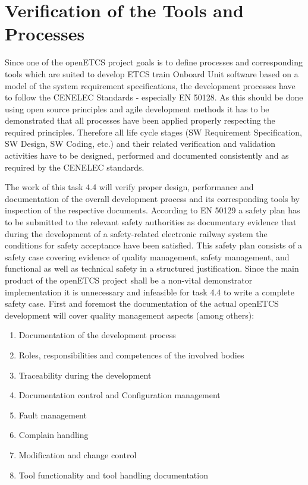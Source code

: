 \section{Verification of the Tools and Processes}
Since one of the openETCS project goals is to define processes and corresponding tools which are suited to develop ETCS train Onboard Unit software based on a model of the system requirement specifications, the development processes have to follow the CENELEC Standards - especially EN 50128. As this should be done using open source principles and agile development methods it has to be demonstrated that all processes have been applied properly respecting the required principles. Therefore all life cycle stages (SW Requirement Specification, SW Design, SW Coding, etc.) and their related verification and validation activities have to be designed, performed and documented consistently and as required by the CENELEC standards. 

The work of this task 4.4 will verify proper design, performance and documentation of the overall development process and its corresponding tools by inspection of the respective documents. According to EN 50129 a safety plan has to be submitted to the relevant safety authorities as documentary evidence that during the development of a safety-related electronic railway system the conditions for safety acceptance have been satisfied. This safety plan consists of a safety case covering evidence of quality management, safety management, and functional as well as technical safety in a structured justification. Since  the main product of the openETCS project shall be a non-vital demonstrator implementation it is unnecessary and infeasible for task 4.4 to write a complete safety case. First and foremost the documentation of the actual openETCS development will cover quality management aspects (among others):
\begin{enumerate}
\item  Documentation of the development process
\item  Roles, responsibilities and competences of the involved bodies
\item  Traceability during the development
\item  Documentation control and Configuration management
\item  Fault management
\item  Complain handling
\item  Modification and change control
\item  Tool functionality and tool handling documentation
\end{enumerate}

